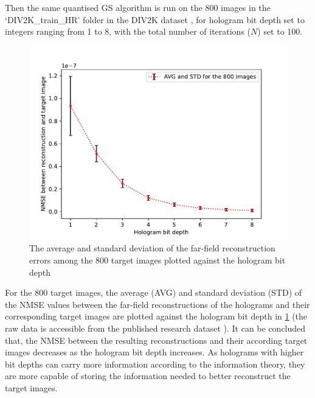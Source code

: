	Then the same quantised GS algorithm is run on the 800 images in the `DIV2K\_train\_HR' folder in the DIV2K dataset \cite{Agustsson2017}, for hologram bit depth set to integers ranging from 1 to 8, with the total number of iterations ($N$) set to 100.

	\begin{figure} [H]
	   \begin{center}
	   \includegraphics[width = \textwidth]{GS_Fraunhofer_NMSE_VS_Hologram bit depth.pdf}
	   \end{center}
	   \caption{\label{fig:GS_Fraunhofer_NMSE_VS_Hologram_bit_depth} The average and standard deviation of the far-field reconstruction errors among the 800 target images plotted against the hologram bit depth}
	\end{figure}

	For the 800 target images, the average (AVG) and standard deviation (STD) of the NMSE values between the far-field reconstructions of the holograms and their corresponding target images are plotted against the hologram bit depth in \cref{fig:GS_Fraunhofer_NMSE_VS_Hologram_bit_depth} (the raw data is accessible from the published research dataset \cite{research_data_Sha2024}). It can be concluded that, the NMSE between the resulting reconstructions and their according target images decreases as the hologram bit depth increases. As holograms with higher bit depths can carry more information according to the information theory, they are more capable of storing the information needed to better reconstruct the target images.

